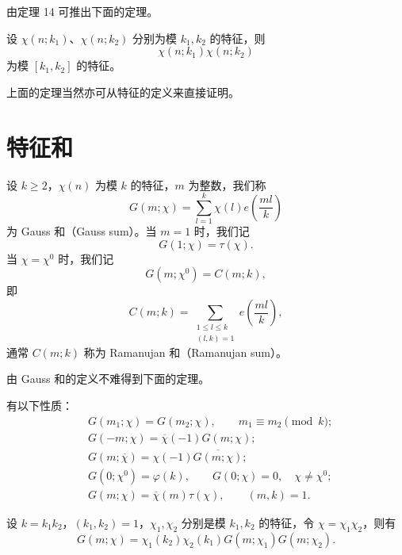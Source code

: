 由定理 14 可推出下面的定理。

\begin{theorem}[原文 定理 15]
	设 $\chi(n;k_1)$、$\chi(n;k_2)$ 分别为模 $k_1,k_2$ 的特征，则
	\[
		\chi(n;k_1)\chi(n;k_2)
	\]
	为模 $[k_1,k_2]$ 的特征。
\end{theorem}

上面的定理当然亦可从特征的定义来直接证明。

\section{特征和}

设 $k\geq2$，$\chi(n)$ 为模 $k$ 的特征，$m$ 为整数，我们称
\begin{equation}
	G(m;\chi)=\sum_{l=1}^{k}\chi(l)e\left(\frac{ml}{k}\right)
	\tag{24}
\end{equation}
为 Gauss 和（Gauss sum）。当 $m=1$ 时，我们记
\begin{equation}
	G(1;\chi)=\tau(\chi).
	\tag{25}
\end{equation}
当 $\chi=\chi^0$ 时，我们记
\begin{equation}
	G(m;\chi^0)=C(m;k),
	\tag{26}
\end{equation}
即
\begin{equation}
	C(m;k)=\sum_{\substack{1\leq l\leq k\\ (l,k)=1}}e\left(\frac{ml}{k}\right),
	\tag{27}
\end{equation}
通常 $C(m;k)$ 称为 Ramanujan 和（Ramanujan sum）。

由 Gauss 和的定义不难得到下面的定理。

\begin{theorem}[原文 定理 16]
	有以下性质：
	\[
	\begin{aligned}
		& G(m_1;\chi)=G(m_2;\chi),\qquad m_1\equiv m_2\pmod k;\\
		& G(-m;\chi)=\overline{\chi}(-1)G(m;\chi);\\
		& G(m;\overline{\chi})=\chi(-1)\overline{G(m;\chi)};\\
		& G(0;\chi^0)=\varphi(k),\qquad G(0;\chi)=0,\quad \chi\neq\chi^0;\\
		& G(m;\chi)=\overline{\chi}(m)\tau(\chi),\qquad (m,k)=1.
	\end{aligned}
	\]
\end{theorem}

\begin{theorem}[原文 定理 17]
	设 $k=k_1k_2$，$(k_1,k_2)=1$，$\chi_1,\chi_2$ 分别是模 $k_1,k_2$ 的特征，令 $\chi=\chi_1\chi_2$，则有
	\begin{equation}
		G(m;\chi)=\chi_1(k_2)\chi_2(k_1)G(m;\chi_1)G(m;\chi_2).
		\tag{28}
	\end{equation}
\end{theorem}

